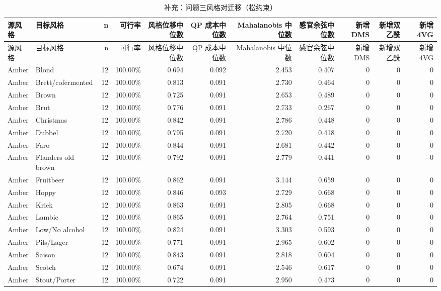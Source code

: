 {\footnotesize
\setlength{\tabcolsep}{3.5pt}
\begin{longtable}{llrrrrrrrrr}
\caption{补充：问题三风格对迁移（松约束）}
\label{tab:s04_q3_pairs}\\
\toprule
源风格 & 目标风格 & n & 可行率 & 风格位移中位数 & QP 成本中位数 & Mahalanobis 中位数 & 感官余弦中位数 & 新增 DMS & 新增双乙酰 & 新增 4VG \\
\midrule
\endfirsthead
\toprule
源风格 & 目标风格 & n & 可行率 & 风格位移中位数 & QP 成本中位数 & Mahalanobis 中位数 & 感官余弦中位数 & 新增 DMS & 新增双乙酰 & 新增 4VG \\
\midrule
\endhead
\bottomrule
\endlastfoot
Amber & Blond & 12 & 100.00\% & 0.694 & 0.092 & 2.453 & 0.407 & 0 & 0 & 0 \\
Amber & Brett/cofermented & 12 & 100.00\% & 0.813 & 0.091 & 2.730 & 0.464 & 0 & 0 & 0 \\
Amber & Brown & 12 & 100.00\% & 0.725 & 0.091 & 2.653 & 0.489 & 0 & 0 & 0 \\
Amber & Brut & 12 & 100.00\% & 0.776 & 0.091 & 2.733 & 0.267 & 0 & 0 & 0 \\
Amber & Christmas & 12 & 100.00\% & 0.842 & 0.091 & 2.786 & 0.448 & 0 & 0 & 0 \\
Amber & Dubbel & 12 & 100.00\% & 0.795 & 0.091 & 2.720 & 0.418 & 0 & 0 & 0 \\
Amber & Faro & 12 & 100.00\% & 0.844 & 0.091 & 2.681 & 0.442 & 0 & 0 & 0 \\
Amber & Flanders old brown & 12 & 100.00\% & 0.792 & 0.091 & 2.779 & 0.441 & 0 & 0 & 0 \\
Amber & Fruitbeer & 12 & 100.00\% & 0.862 & 0.091 & 3.144 & 0.659 & 0 & 0 & 0 \\
Amber & Hoppy & 12 & 100.00\% & 0.846 & 0.093 & 2.729 & 0.668 & 0 & 0 & 0 \\
Amber & Kriek & 12 & 100.00\% & 0.863 & 0.091 & 2.805 & 0.668 & 0 & 0 & 0 \\
Amber & Lambic & 12 & 100.00\% & 0.865 & 0.091 & 2.764 & 0.751 & 0 & 0 & 0 \\
Amber & Low/No alcohol & 12 & 100.00\% & 0.824 & 0.091 & 3.303 & 0.593 & 0 & 0 & 0 \\
Amber & Pils/Lager & 12 & 100.00\% & 0.771 & 0.091 & 2.965 & 0.602 & 0 & 0 & 0 \\
Amber & Saison & 12 & 100.00\% & 0.843 & 0.091 & 2.818 & 0.604 & 0 & 0 & 0 \\
Amber & Scotch & 12 & 100.00\% & 0.674 & 0.091 & 2.546 & 0.617 & 0 & 0 & 0 \\
Amber & Stout/Porter & 12 & 100.00\% & 0.722 & 0.091 & 2.950 & 0.473 & 0 & 0 & 0 \\

\end{longtable}}
